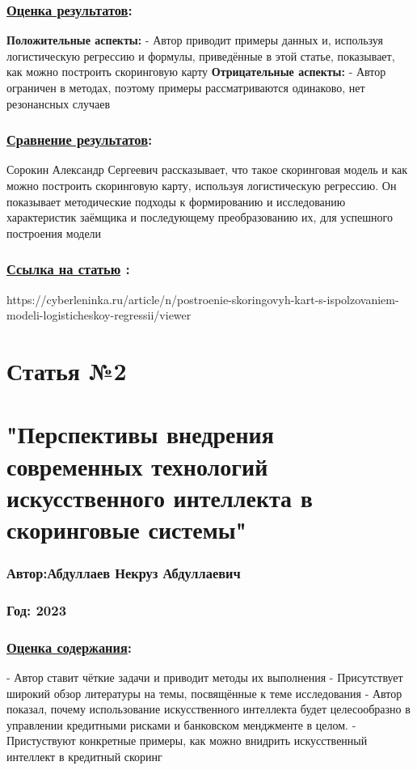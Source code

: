 \documentclass[a4paper,14pt]{article}
\begin{document}
\subsubsection*{\underline{Оценка результатов}:}
\textbf{Положительные аспекты:} \newline
- Автор приводит примеры данных и, используя логистическую регрессию и формулы, приведённые в этой статье, показывает, как можно построить скоринговую карту \newline
\textbf{Отрицательные аспекты:} \newline
- Автор ограничен в методах, поэтому примеры рассматриваются одинаково, нет резонансных случаев \newline
\subsubsection*{\underline{Сравнение результатов}:}
Сорокин Александр Сергеевич рассказывает, что такое скоринговая модель и как можно построить скоринговую карту, используя логистическую регрессию. Он показывает методические подходы к формированию и исследованию характеристик заёмщика и последующему преобразованию их, для успешного построения модели
\subsubsection*{\underline{Ссылка на статью} :}
https://cyberleninka.ru/article/n/postroenie-skoringovyh-kart-s-ispolzovaniem-modeli-logisticheskoy-regressii/viewer


\newpage

\section*{Статья №2}
\section*{"Перспективы внедрения современных технологий искусственного интеллекта в скоринговые системы"}
\subsubsection*{Автор:Абдуллаев Некруз Абдуллаевич}
\subsubsection*{Год: 2023}
\vspace{14pt}
\subsubsection*{\underline{Оценка содержания}:}
- Автор ставит чёткие задачи и приводит методы их выполнения \newline
- Присутствует широкий обзор литературы на темы, посвящённые к теме исследования\newline
- Автор показал, почему использование искусственного интеллекта будет целесообразно в управлении кредитными рисками и банковском менджменте в целом. \newline
- Пристуствуют конкретные примеры, как можно внидрить искусственный интеллект в кредитный скоринг\newline
\end{document}
